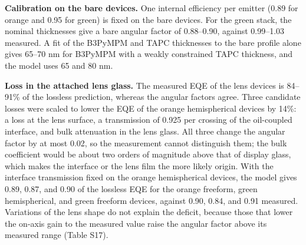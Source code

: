 \documentclass[10pt]{article}
\begin{document}
\textbf{Calibration on the bare devices.} One internal efficiency per emitter (0.89 for orange and 0.95 for green) is fixed on the bare devices. For the green stack, the nominal thicknesses give a bare angular factor of 0.88–0.90, against 0.99–1.03 measured. A fit of the B3PyMPM and TAPC thicknesses to the bare profile alone gives 65–70 nm for B3PyMPM with a weakly constrained TAPC thickness, and the model uses 65 and 80 nm.

\textbf{Loss in the attached lens glass.} The measured EQE of the lens devices is 84–91\% of the lossless prediction, whereas the angular factors agree. Three candidate losses were scaled to lower the EQE of the orange hemispherical devices by 14\%: a loss at the lens surface, a transmission of 0.925 per crossing of the oil-coupled interface, and bulk attenuation in the lens glass. All three change the angular factor by at most 0.02, so the measurement cannot distinguish them; the bulk coefficient would be about two orders of magnitude above that of display glass, which makes the interface or the lens film the more likely origin. With the interface transmission fixed on the orange hemispherical devices, the model gives 0.89, 0.87, and 0.90 of the lossless EQE for the orange freeform, green hemispherical, and green freeform devices, against 0.90, 0.84, and 0.91 measured. Variations of the lens shape do not explain the deficit, because those that lower the on-axis gain to the measured value raise the angular factor above its measured range (Table S17).
\end{document}
